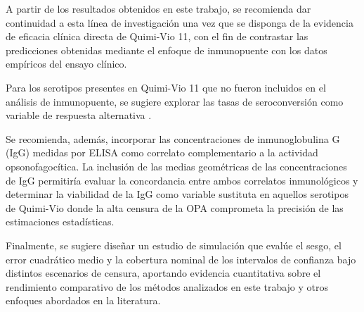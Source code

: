 \begin{recomendations}
    A partir de los resultados obtenidos en este trabajo, se recomienda dar continuidad a esta línea de investigación una vez que se disponga de la evidencia de eficacia clínica directa de Quimi-Vio 11, con el fin de contrastar las predicciones obtenidas mediante el enfoque de inmunopuente con los datos empíricos del ensayo clínico. 
    
    Para los serotipos presentes en Quimi-Vio 11 que no fueron incluidos en el análisis de inmunopuente, se sugiere explorar las tasas de seroconversión como variable de respuesta alternativa \cite{nauta2020, mcelwee2026overview}.
    
    Se recomienda, además, incorporar las concentraciones de inmunoglobulina G (IgG) medidas por ELISA como correlato complementario a la actividad opsonofagocítica. La inclusión de las medias geométricas de las concentraciones de IgG permitiría evaluar la concordancia entre ambos correlatos inmunológicos y determinar la viabilidad de la IgG como variable sustituta en aquellos serotipos de Quimi-Vio donde la alta censura de la OPA comprometa la precisión de las estimaciones estadísticas.
    
    Finalmente, se sugiere diseñar un estudio de simulación que evalúe el sesgo, el error cuadrático medio y la cobertura nominal de los intervalos de confianza bajo distintos escenarios de censura, aportando evidencia cuantitativa sobre el rendimiento comparativo de los métodos analizados en este trabajo y otros enfoques abordados en la literatura.
\end{recomendations}
